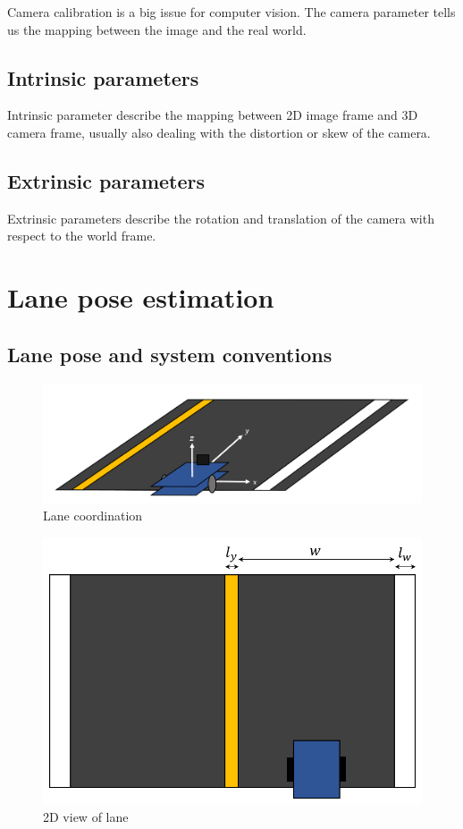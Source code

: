 \documentclass{article}
\begin{document}
Camera calibration is a big issue for computer vision. The camera parameter tells us the mapping between the image and the real world.

\subsection{Intrinsic parameters}

Intrinsic parameter describe the mapping between 2D image frame and 3D camera frame, usually also dealing with the distortion or skew of the camera.

\subsection{Extrinsic parameters}

Extrinsic parameters describe the rotation and translation of the camera with respect to the world frame.

\clearpage

\section{Lane pose estimation}

\subsection{Lane pose and system conventions}
\begin{figure}[ht]
  \label{fig:lane_coordination}
  \centering
  \includegraphics[scale=0.6]{graphs/coordinate_system.PNG}
  \caption{Lane coordination}
\end{figure}
\FloatBarrier

\begin{figure}[ht]
  \label{fig:lane_2d_view}
  \centering
  \includegraphics[scale=0.6]{graphs/lane_parameter_2d_view.PNG}
  \caption{2D view of lane}
\end{figure}
\FloatBarrier
\end{document}

